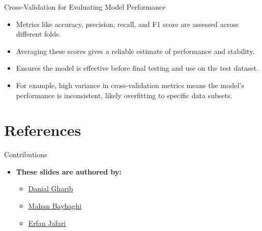 \documentclass[serif, aspectratio=169]{beamer}
\begin{document}
\begin{frame}{Cross-Validation for Evaluating Model Performance}
    \begin{itemize}\itemsep1.2em
        \item Metrics like accuracy, precision, recall, and F1 score are assessed across different folds.
        \item Averaging these scores gives a reliable estimate of performance and stability.
        \item Ensures the model is effective before final testing and use on the test dataset.
        \item \justifying For example, high variance in cross-validation metrics means the model's performance is inconsistent, likely overfitting to specific data subsets.
    \end{itemize}
\end{frame}

\section{References}

\begin{frame}{Contributions}
\begin{itemize}
\item \textbf{These slides are authored by:}
\medskip
\begin{itemize}
    \setlength{\itemsep}{10pt} %
    \item \href{https://github.com/Danial-Gharib}{Danial Gharib}
    \item \href{https://github.com/Mahan-Bayhaghi}{Mahan Bayhaghi}
    \item \href{https://github.com/jefri021}{Erfan Jafari}
\end{itemize}
\end{itemize}

\end{frame}

\begin{frame}[allowframebreaks]
    
    
    \nocite{*}
\end{frame}
\end{document}
